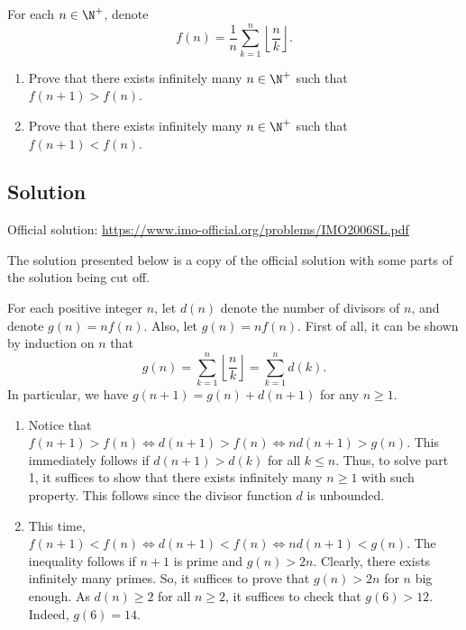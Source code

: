 For each $n \in \N^+$, denote
\[ f(n) = \frac{1}{n} \sum_{k = 1}^n \left\lfloor \frac{n}{k} \right\rfloor. \]
\begin{enumerate}
    \item Prove that there exists infinitely many $n \in \N^+$ such that $f(n + 1) > f(n)$.
    \item Prove that there exists infinitely many $n \in \N^+$ such that $f(n + 1) < f(n)$.
\end{enumerate}



\subsection*{Solution}

Official solution: \url{https://www.imo-official.org/problems/IMO2006SL.pdf}

The solution presented below is a copy of the official solution with some parts of the solution being cut off.

For each positive integer $n$, let $d(n)$ denote the number of divisors of $n$, and denote $g(n) = n f(n)$.
Also, let $g(n) = n f(n)$.
First of all, it can be shown by induction on $n$ that
\[ g(n) = \sum_{k = 1}^n \left\lfloor \frac{n}{k} \right\rfloor = \sum_{k = 1}^n d(k). \]
In particular, we have $g(n + 1) = g(n) + d(n + 1)$ for any $n \geq 1$.

\begin{enumerate}

\item
Notice that $f(n + 1) > f(n) \iff d(n + 1) > f(n) \iff n d(n + 1) > g(n)$.
This immediately follows if $d(n + 1) > d(k)$ for all $k \leq n$.
Thus, to solve part 1, it suffices to show that there exists infinitely many $n \geq 1$ with such property.
This follows since the divisor function $d$ is unbounded.

\item
This time, $f(n + 1) < f(n) \iff d(n + 1) < f(n) \iff n d(n + 1) < g(n)$.
The inequality follows if $n + 1$ is prime and $g(n) > 2n$.
Clearly, there exists infinitely many primes.
So, it suffices to prove that $g(n) > 2n$ for $n$ big enough.
As $d(n) \geq 2$ for all $n \geq 2$, it suffices to check that $g(6) > 12$.
Indeed, $g(6) = 14$.

\end{enumerate}
